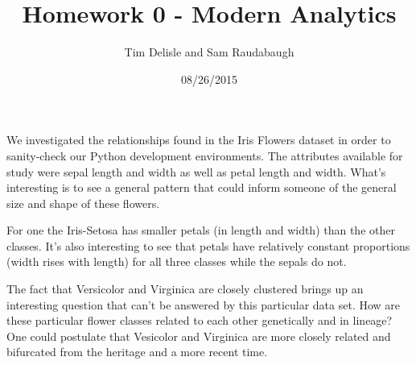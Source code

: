 \documentclass[12pt]{report}
\begin{document}
\lstset{language=Python}

\title{Homework 0 - Modern Analytics}
\author{Tim Delisle and Sam Raudabaugh}
\date{08/26/2015}
\maketitle




We investigated the relationships found in the Iris Flowers dataset in order to sanity-check our Python development environments. The attributes available for study were sepal length and width as well as petal length and width. What's interesting is to see a general pattern that could inform someone of the general size and shape of these flowers.

For one the Iris-Setosa has smaller petals (in length and width) than the other classes. It's also interesting to see that petals have relatively constant proportions (width rises with length)  for all three classes while the sepals do not.

The fact that Versicolor and Virginica are closely clustered brings up an interesting question that can't be answered by this particular data set. How are these particular flower classes related to each other genetically and in lineage? One could postulate that Vesicolor and Virginica are more closely related and bifurcated from the heritage and a more recent time.\newline
\end{document}
